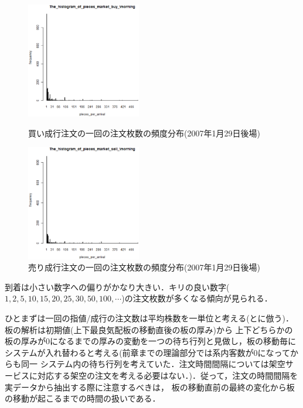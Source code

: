 \documentclass[a4j,papersize,disablejfam,slide,14pt]{jsarticle}
\begin{document}
    \begin{figure}[H]
        \begin{minipage}{1\hsize}
        	\begin{center}
    			\includegraphics[clip,width = 5.0cm]{graphics/pieces_market_buy20070129_.eps}
            \end{center}
            \caption{\scriptsize 買い成行注文の一回の注文枚数の頻度分布(2007年1月29日後場)}
        \end{minipage}
        \begin{minipage}{1\hsize}
        	\begin{center}
    			\includegraphics[clip,width = 5.0cm]{graphics/pieces_market_sell20070129_.eps}
            \end{center}
            \caption{\scriptsize 売り成行注文の一回の注文枚数の頻度分布(2007年1月29日後場)}
        \end{minipage}
    \end{figure}
    
    到着は小さい数字への偏りがかなり大きい．キリの良い数字($1,2,5,10,15,20,25,30,50,100,\cdots$)の注文枚数が多くなる傾向が見られる．
    
    ひとまずは一回の指値/成行の注文数は平均株数を一単位と考える(\cite{endo_zuo_kishimoto}と\cite{li_hui_endo_kishimoto}に倣う)．板の解析は初期値(上下最良気配板の移動直後の板の厚み)から
    上下どちらかの板の厚みが$0$になるまでの厚みの変動を一つの待ち行列と見做し，板の移動毎にシステムが入れ替わると考える(前章までの理論部分では系内客数が$0$になってからも同一
    システム内の待ち行列を考えていた．注文時間間隔については架空サービスに対応する架空の注文を考える必要はない．)．従って，注文の時間間隔を実データから抽出する際に注意するべきは，
    板の移動直前の最終の変化から板の移動が起こるまでの時間の扱いである．\\
    
\end{document}
